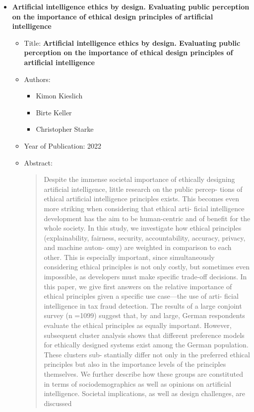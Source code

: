 \documentclass{article}
\begin{document}
\begin{itemize}
        \item \textbf{Artificial intelligence ethics by design.
        Evaluating public perception on the
        importance of ethical design principles
        of artificial intelligence}
        \begin{itemize}
            \item Title: \textbf{Artificial intelligence ethics by design.
            Evaluating public perception on the
            importance of ethical design principles
            of artificial intelligence}
            \item Authors:
            \begin{itemize}
                \item Kimon Kieslich
                \item Birte Keller
                \item Christopher Starke
            \end{itemize}
            \item Year of Publication: 2022
            \item Abstract:
            \begin{abstract}
                Despite the immense societal importance of ethically designing artificial intelligence, little research on the public percep-
                tions of ethical artificial intelligence principles exists. This becomes even more striking when considering that ethical arti-
                ficial intelligence development has the aim to be human-centric and of benefit for the whole society. In this study, we
                investigate how ethical principles (explainability, fairness, security, accountability, accuracy, privacy, and machine auton-
                omy) are weighted in comparison to each other. This is especially important, since simultaneously considering ethical
                principles is not only costly, but sometimes even impossible, as developers must make specific trade-off decisions. In
                this paper, we give first answers on the relative importance of ethical principles given a specific use case—the use of arti-
                ficial intelligence in tax fraud detection. The results of a large conjoint survey (n =1099) suggest that, by and large,
                German respondents evaluate the ethical principles as equally important. However, subsequent cluster analysis shows
                that different preference models for ethically designed systems exist among the German population. These clusters sub-
                stantially differ not only in the preferred ethical principles but also in the importance levels of the principles themselves.
                We further describe how these groups are constituted in terms of sociodemographics as well as opinions on artificial
                intelligence. Societal implications, as well as design challenges, are discussed
            \end{abstract}
        \end{itemize}
        

\end{itemize}
\end{document}
